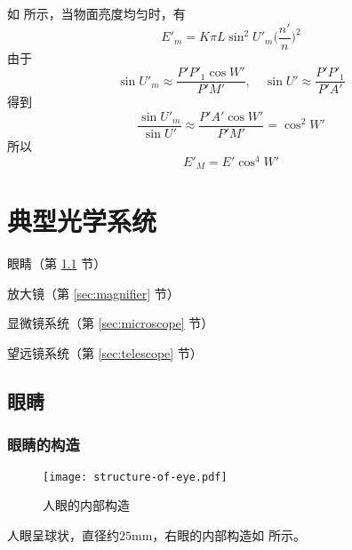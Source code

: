 \documentclass[cn,10pt,chinesefont=founder,math=mtpro2,cite=super,toc=onecol,twoside,openany]{elegantbook}
\begin{document}
如 所示，当物面亮度均匀时，有
\begin{equation}
E'_m=K\pi L\sin^2U'_m\bigg(\frac{n'}{n}\bigg)^2
\end{equation}
由于
\begin{equation}
\sin U'_m\approx\frac{P'P'_1\cos W'}{P'M'},\quad\sin U'\approx\frac{P'P'_1}{P'A'}
\end{equation}
得到
\begin{equation}
\frac{\sin U'_m}{\sin U'}\approx\frac{P'A'\cos W'}{P'M'}=\cos^2 W'
\end{equation}
所以
\begin{equation}
E'_M=E'\cos^4 W'
\end{equation}

\chapter{典型光学系统}

\begin{introduction}
	\item 眼睛（第 \ref{sec:eye} 节）
	\item 放大镜（第 \ref{sec:magnifier} 节）
	\item 显微镜系统（第 \ref{sec:microscope} 节）
	\item 望远镜系统（第 \ref{sec:telescope} 节）
\end{introduction}

\section{眼睛}
\label{sec:eye}
\subsection{眼睛的构造}

\begin{figure}[htbp]
	\centering
	\texttt{[image: structure-of-eye.pdf]}
	\caption{人眼的内部构造}
	\label{fig:structure-of-eye}
\end{figure}

人眼呈球状，直径约$25\mathrm{mm}$，右眼的内部构造如 所示。
\end{document}

